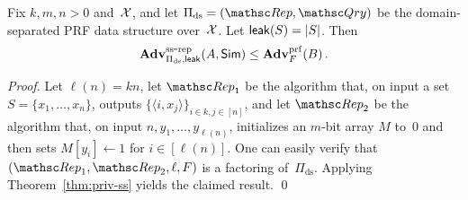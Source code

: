 \begin{theorem}%
\label{thm:ds-ss} Fix $k,m,n>0$ and~${\cal X}$, and let
$\setprim_{\mathrm{ds}}= (\Rep, \Qry)$ be the domain-separated PRF
data structure over~${\cal X}$.  Let ${\sf leak}(S)=|S|$. Then 
\[
\mathrm{\mathbf{Adv}}^{\mathrm{ss\mbox{-}rep}}_{\Pi_{\mathrm{ds}},{\sf leak}}(A,{\sf Sim}) \leq
\mathbf{Adv}^{\mathrm{prf}}_{F}(B)\,.
\]
\end{theorem}
\begin{proof}
Let $\ell(n) = kn$, let $\Rep_1$ be the algorithm that, on input a
set $S=\{x_1,\ldots,x_n\}$, outputs $\{\langle i,x_j \rangle\}_{i\in
{k}, j \in [n]}$, and let $\Rep_2$ be the algorithm that, on input
$n,y_1, \ldots, y_{\ell(n)}$, initializes an $m$-bit array $M$ to~0
and then sets $M[y_i] \gets 1$ for $i \in [\ell(n)]$. One can easily
verify that $(\Rep_1, \Rep_2, \ell, F)$ is a factoring
of~$\Pi_{\mathrm{ds}}$. Applying Theorem~\ref{thm:priv-ss} yields
the claimed result. \hfill\qed
\end{proof}


